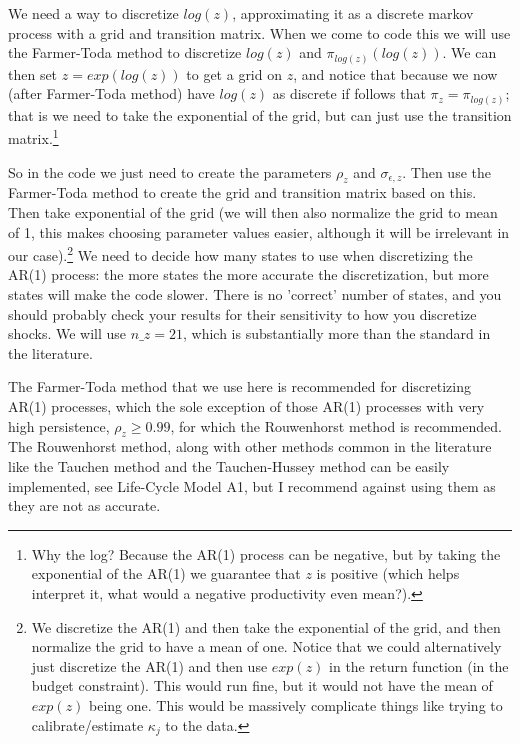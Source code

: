 We need a way to discretize $log(z)$, approximating it as a discrete markov process with a grid and transition matrix. When we come to code this we will use the Farmer-Toda method to discretize $log(z)$ and $\pi_{log(z)}(log(z))$. We can then set $z=exp(log(z))$ to get a grid on $z$, and notice that because we now (after Farmer-Toda method) have $log(z)$ as discrete if follows that $\pi_z=\pi_{log(z)}$; that is we need to take the exponential of the grid, but can just use the transition matrix.\footnote{Why the log? Because the AR(1) process can be negative, but by taking the exponential of the AR(1) we guarantee that $z$ is positive (which helps interpret it, what would a negative productivity even mean?).}

So in the code we just need to create the parameters $\rho_z$ and $\sigma_{\epsilon,z}$. Then use the Farmer-Toda method to create the grid and transition matrix based on this. Then take exponential of the grid (we will then also normalize the grid to mean of 1, this makes choosing parameter values easier, although it will be irrelevant in our case).\footnote{We discretize the AR(1) and then take the exponential of the grid, and then normalize the grid to have a mean of one. Notice that we could alternatively just discretize the AR(1) and then use $exp(z)$ in the return function (in the budget constraint). This would run fine, but it would not have the mean of $exp(z)$ being one. This would be massively complicate things like trying to calibrate/estimate $\kappa_j$ to the data.} We need to decide how many states to use when discretizing the AR(1) process: the more states the more accurate the discretization, but more states will make the code slower. There is no 'correct' number of states, and you should probably check your results for their sensitivity to how you discretize shocks. We will use $n\_{}z=21$, which is substantially more than the standard in the literature.

The Farmer-Toda method that we use here is recommended for discretizing AR(1) processes, which the sole exception of those AR(1) processes with very high persistence, $\rho_z \geq 0.99$, for which the Rouwenhorst method is recommended. The Rouwenhorst method, along with other methods common in the literature like the Tauchen method and the Tauchen-Hussey method can be easily implemented, see Life-Cycle Model A1, but I recommend against using them as they are not as accurate.

